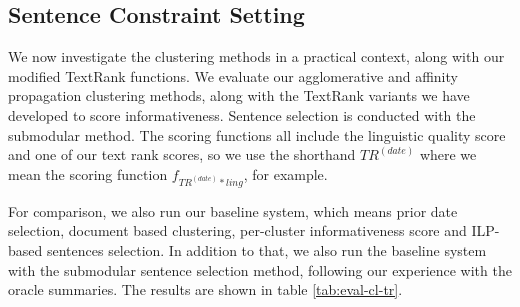 \documentclass[a4paper,BCOR=10mm]{report}
\numberwithin{lemma}{chapter}
\numberwithin{definition}{chapter}
\begin{document}


\subsection{Sentence Constraint Setting}

%
%



We now investigate the clustering methods in a practical context, along with our modified TextRank functions.
We evaluate our agglomerative and affinity propagation clustering methods, along with the TextRank variants we have developed to score informativeness. Sentence selection is conducted with the submodular method.
The scoring functions all include the linguistic quality score and one of our text rank scores, so we use the shorthand $TR^{(date)}$ where we mean the scoring function $f_{TR^{(date)} * ling}$, for example.

For comparison, we also run our baseline system, which means prior date selection, document based clustering, per-cluster informativeness score and ILP-based sentences selection.
In addition to that, we also run the baseline system with the submodular sentence selection method, following our experience with the oracle summaries.
The results are shown in table \ref{tab:eval-cl-tr}.
\end{document}
